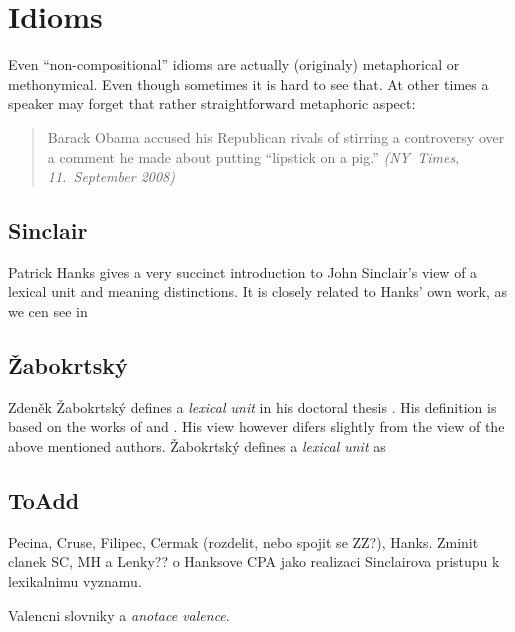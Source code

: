 \chapter{Idioms}
Even ``non-compositional'' idioms are actually (originaly) metaphorical or methonymical.  Even though sometimes it is hard to see that. At other times a speaker may forget that rather straightforward metaphoric aspect:

\begin{quote}
Barack Obama accused his Republican rivals of stirring a controversy over a comment he made about putting “lipstick on a pig.” \emph{(NY~Times, 11.~September 2008)}
\end{quote}

\section{Sinclair}
Patrick Hanks gives a very succinct introduction to John Sinclair's \citep{sinclair:wiki} view of a lexical unit and meaning distinctions. It is closely related to Hanks' own work, as we cen see in \citet{hanks:norms-and-exploitations}

\section{Žabokrtský}
Zdeněk Žabokrtský defines a \emph{lexical unit} in his doctoral thesis \citep{zabokrtsky:2005a}. His definition is based on the works of \citet{cermak:91} and \citet{filipec:1994}. His view however difers slightly from the view of the above mentioned authors. Žabokrtský defines a \emph{lexical unit} as

\section{ToAdd}
Pecina, Cruse, Filipec, Cermak (rozdelit, nebo spojit se ZZ?), Hanks. Zminit clanek SC, MH a Lenky?? o Hanksove CPA jako realizaci Sinclairova pristupu k lexikalnimu vyznamu.

Valencni slovniky a \emph{anotace valence}.
